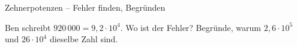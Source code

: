 \begin{aufgabe}{Zehnerpotenzen – Fehler finden, Begründen}
\begin{teile}
\teil Ben schreibt $920\,000 = 9{,}2 \cdot 10^{4}$. Wo ist der Fehler?
\teil Begründe, warum $2{,}6 \cdot 10^{5}$ und $26 \cdot 10^{4}$ dieselbe Zahl sind.
\end{teile}
\end{aufgabe}
